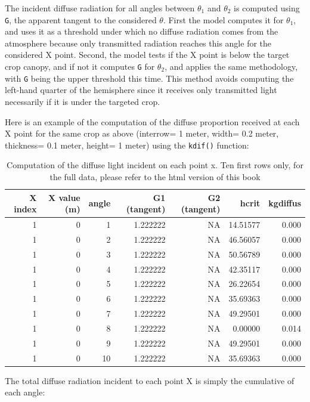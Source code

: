 \documentclass[]{book}
\begin{document}
The incident diffuse radiation for all angles between \(\theta_1\) and \(\theta_2\) is computed using \texttt{G}, the apparent tangent to the considered \(\theta\). First the model computes it for \(\theta_1\), and uses it as a threshold under which no diffuse radiation comes from the atmosphere because only transmitted radiation reaches this angle for the considered X point. Second, the model tests if the X point is below the target crop canopy, and if not it computes \texttt{G} for \(\theta_2\), and applies the same methodology, with \texttt{G} being the upper threshold this time. This method avoids computing the left-hand quarter of the hemisphere since it receives only transmitted light necessarily if it is under the targeted crop.

Here is an example of the computation of the diffuse proportion received at each X point for the same crop as above (interrow= 1 meter, width= 0.2 meter, thickness= 0.1 meter, height= 1 meter) using the \texttt{kdif()} function:

\begin{longtable}{r|r|r|r|r|r|r}
\caption{\label{tab:kdiff}Computation of the diffuse light incident on each point x. Ten first rows only, for the full data, please refer to the html version of this book}\\
\hline
X index & X value (m) & angle & G1 (tangent) & G2 (tangent) & hcrit & kgdiffus\\
\hline
1 & 0 & 1 & 1.222222 & NA & 14.51577 & 0.000\\
\hline
1 & 0 & 2 & 1.222222 & NA & 46.56057 & 0.000\\
\hline
1 & 0 & 3 & 1.222222 & NA & 50.56789 & 0.000\\
\hline
1 & 0 & 4 & 1.222222 & NA & 42.35117 & 0.000\\
\hline
1 & 0 & 5 & 1.222222 & NA & 26.22654 & 0.000\\
\hline
1 & 0 & 6 & 1.222222 & NA & 35.69363 & 0.000\\
\hline
1 & 0 & 7 & 1.222222 & NA & 49.29501 & 0.000\\
\hline
1 & 0 & 8 & 1.222222 & NA & 0.00000 & 0.014\\
\hline
1 & 0 & 9 & 1.222222 & NA & 49.29501 & 0.000\\
\hline
1 & 0 & 10 & 1.222222 & NA & 35.69363 & 0.000\\
\hline
\end{longtable}

The total diffuse radiation incident to each point X is simply the cumulative of each angle:
\end{document}
